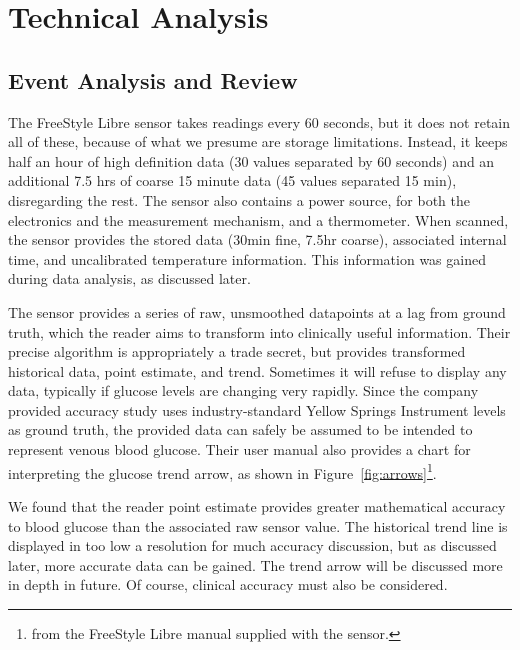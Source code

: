 \chapter{Technical Analysis}

\section{Event Analysis and Review}

The FreeStyle Libre sensor takes readings every 60 seconds, but it does not retain all of these, because of what we presume are storage limitations. Instead, it keeps half an hour of high definition data (30 values separated by 60 seconds) and an additional 7.5 hrs of coarse 15 minute data (45 values separated 15 min), disregarding the rest. The sensor also contains a power source, for both the electronics and the measurement mechanism, and a thermometer. When scanned, the sensor provides the stored data (30min fine, 7.5hr coarse), associated internal time, and uncalibrated temperature information. This information was gained during data analysis, as discussed later.

The sensor provides a series of raw, unsmoothed datapoints at a lag from ground truth, which the reader aims to transform into clinically useful information. Their precise algorithm is appropriately a trade secret, but provides transformed historical data, point estimate, and trend. Sometimes it will refuse to display any data, typically if glucose levels are changing very rapidly. Since the company provided accuracy study uses industry-standard Yellow Springs Instrument levels as ground truth, the provided data can safely be assumed to be intended to represent venous blood glucose. Their user manual also provides a chart for interpreting the glucose trend arrow, as shown in Figure~\ref{fig:arrows}\footnote{from the FreeStyle Libre manual supplied with the sensor.}. 

We found that the reader point estimate provides greater mathematical accuracy to blood glucose than the associated raw sensor value. The historical trend line is displayed in too low a resolution for much accuracy discussion, but as discussed later, more accurate data can be gained. The trend arrow will be discussed more in depth in future. Of course, clinical accuracy must also be considered.

